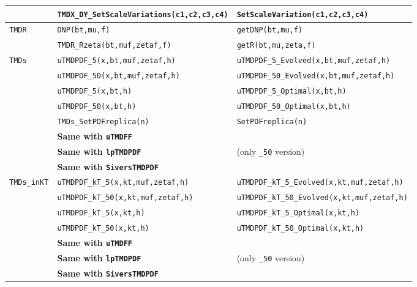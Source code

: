 \documentclass[prd,nofootinbib,eqsecnum,final]{revtex4}
\renewcommand{\(}{\left(}
\renewcommand{\)}{\right)}
\renewcommand{\[}{\left[}
\renewcommand{\]}{\right]}
\newcommand{\blue}[1]{{\color{blue} #1}}
\begin{document}
\begin{center}
\begin{longtable}{|l|l||p{6cm}|}
\\\cline{2-3}
& \texttt{TMDX\_DY\_SetScaleVariations(c1,c2,c3,c4)} & \texttt{SetScaleVariation(c1,c2,c3,c4)} 
\\\hline
\texttt{TMDR} & \texttt{DNP(bt,mu,f)} & \texttt{getDNP(bt,mu,f)} 
\\\cline{2-3}
& \texttt{TMDR\_Rzeta(bt,muf,zetaf,f)} & \texttt{getR(bt,mu,zeta,f)} 
\\\hline
\texttt{TMDs} & \texttt{uTMDPDF\_5(x,bt,muf,zetaf,h)} & \texttt{uTMDPDF\_5\_Evolved(x,bt,muf,zetaf,h)} 
\\\cline{2-3}
& \texttt{uTMDPDF\_50(x,bt,muf,zetaf,h)} & \texttt{uTMDPDF\_50\_Evolved(x,bt,muf,zetaf,h)} 
\\\cline{2-3}
& \texttt{uTMDPDF\_5(x,bt,h)} & \texttt{uTMDPDF\_5\_Optimal(x,bt,h)} 
\\\cline{2-3}
& \texttt{uTMDPDF\_50(x,bt,h)} & \texttt{uTMDPDF\_50\_Optimal(x,bt,h)} 
\\\cline{2-3}
& \texttt{TMDs\_SetPDFreplica(n)} & \texttt{SetPDFreplica(n)} 
\\\cline{2-3} & \textbf{\blue{Same with \texttt{uTMDFF}}} &
\\\cline{2-3} & \textbf{\blue{Same with \texttt{lpTMDPDF}}} & (only \texttt{\_50} version)
\\\cline{2-3} & \textbf{\blue{Same with \texttt{SiversTMDPDF}}} &
\\\hline
\texttt{TMDs\_inKT} & \texttt{uTMDPDF\_kT\_5(x,kt,muf,zetaf,h)} & \texttt{uTMDPDF\_kT\_5\_Evolved(x,kt,muf,zetaf,h)} 
\\\cline{2-3}
& \texttt{uTMDPDF\_kT\_50(x,kt,muf,zetaf,h)} & \texttt{uTMDPDF\_kT\_50\_Evolved(x,kt,muf,zetaf,h)} 
\\\cline{2-3}
& \texttt{uTMDPDF\_kT\_5(x,kt,h)} & \texttt{uTMDPDF\_kT\_5\_Optimal(x,kt,h)} 
\\\cline{2-3}
& \texttt{uTMDPDF\_kT\_50(x,kt,h)} & \texttt{uTMDPDF\_kT\_50\_Optimal(x,kt,h)} 
\\\cline{2-3} & \textbf{\blue{Same with \texttt{uTMDFF}}} &
\\\cline{2-3} & \textbf{\blue{Same with \texttt{lpTMDPDF}}} & (only \texttt{\_50} version)
\\\cline{2-3} & \textbf{\blue{Same with \texttt{SiversTMDPDF}}} &

\end{longtable}
\end{center}
\end{document}
